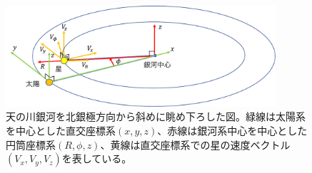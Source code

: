 \begin{figure}[htbp]
\begin{center}
	\includegraphics[width=10cm]{fig/Coordinates.pdf}
	\caption{天の川銀河を北銀極方向から斜めに眺め下ろした図。緑線は太陽系を中心とした直交座標系$(x,y,z)$、赤線は銀河系中心を中心とした円筒座標系$(R,\phi,z)$、黄線は直交座標系での星の速度ベクトル$(V_x,V_y,V_z)$を表している。}
	\label{fig:coordinates}
\end{center}
\end{figure}

